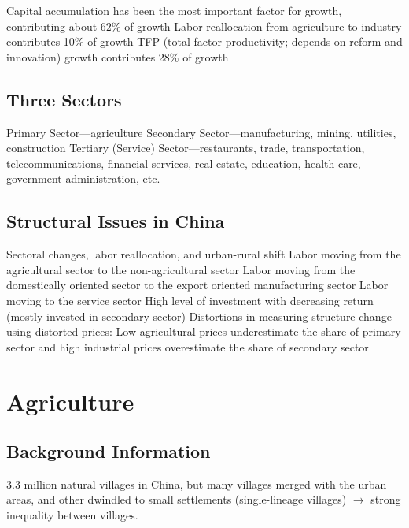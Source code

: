 \documentclass[11pt]{article}
\theoremstyle{definition}
\theoremstyle{remark}
\begin{document}
\begin{outline}[enumerate]
\1 Capital accumulation has been the most important factor for growth, contributing about 62\% of growth
\1 Labor reallocation from agriculture to industry contributes 10\% of growth
\1 TFP (total factor productivity; depends on reform and innovation) growth contributes 28\% of growth
\end{outline}

\subsection{Three Sectors}
\begin{outline}[enumerate]
\1 Primary Sector---agriculture
\1 Secondary Sector---manufacturing, mining, utilities, construction
\1 Tertiary (Service) Sector---restaurants, trade, transportation, telecommunications, financial services, real estate, education, health care, government administration, etc.
\end{outline}

\subsection{Structural Issues in China}
\begin{outline}[enumerate]
\1 Sectoral changes, labor reallocation, and urban-rural shift
	\2 Labor moving from the agricultural sector to the non-agricultural sector
	\2 Labor moving from the domestically oriented sector to the export oriented manufacturing sector
	\2 Labor moving to the service sector
\1 High level of investment with decreasing return (mostly invested in secondary sector)
\1 Distortions in measuring structure change using distorted prices:
	\2 Low agricultural prices underestimate the share of primary sector and high industrial prices overestimate the share of secondary sector
\end{outline}
\clearpage

\section{Agriculture}
\subsection{Background Information}
3.3 million natural villages in China, but many villages merged with the urban areas, and other dwindled to small settlements (single-lineage villages) $\to$ strong inequality between villages.
\end{document}

